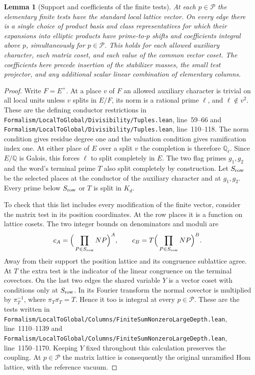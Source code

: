 \documentclass[a4paper,11pt]{article}
\newtheorem{lemma}[proposition]{Lemma}
\theoremstyle{definition}
\theoremstyle{remark}
\newcommand{\srcloc}[2]{{\small\nolinkurl{#1.lean}}, line~#2}
\numberwithin{equation}{section}
\begin{document}
\begin{lemma}[Support and coefficients of the finite tests]\leavevmode
\label{lem:signalsupport452}
At each \(p\in\mathcal P\) the elementary finite tests have the
standard local lattice vector. On every edge there is a single
choice of product basis and class representatives for which their
expansions into elliptic products have prime-to-\(p\) shifts and
coefficients integral above \(p\), simultaneously for
\(p\in\mathcal P\). This holds for each allowed auxiliary
character, each matrix coset, and each value of the common vector
coset. The coefficients here precede insertion of the stabilizer
masses, the small test projector, and any additional scalar
linear combination of elementary columns.
\end{lemma}
\begin{proof}
Write \(F=E^+\). At a place \(v\) of \(F\) an allowed auxiliary
character is trivial on all local units unless \(v\) splits in
\(E/F\), its norm is a rational prime \(\ell\), and
\(\ell\notin v^2\). These are the defining conductor restrictions
in \srcloc{Formalism/LocalToGlobal/Divisibility/Tuples}{59--66}
and \srcloc{Formalism/LocalToGlobal/Divisibility/Tuples}{110--118}.
The norm condition gives residue degree one and the valuation
condition gives ramification index one. At either place of \(E\)
over a split \(v\) the completion is therefore \(\mathbb Q_\ell\).
Since \(E/\mathbb Q\) is Galois, this forces \(\ell\) to split
completely in \(E\). The two flag primes \(g_1,g_2\) and the
word's terminal prime \(T\) also split completely by construction.
Let \(S_{\rm row}\) be the selected places at the conductor of
the auxiliary character and at \(g_1,g_2\). Every prime below
\(S_{\rm row}\) or \(T\) is split in \(K_d\).

To check that this list includes every modification of the finite
vector, consider the matrix test in its position coordinates.
At the row places it is a function on lattice cosets. The two
integer bounds on denominators and moduli are
\[
       c_A=\Big(\prod_{P\in S_{\rm row}} N P\Big)^A,\qquad
       c_B=T\Big(\prod_{P\in S_{\rm row}} N P\Big)^B .
\]
Away from their support the position lattice and its congruence
sublattice agree. At \(T\) the extra test is the indicator of the
linear congruence on the terminal covectors. On the last two
edges the shared variable \(Y\) is a vector coset with conditions
only at \(S_{\rm row}\). In its Fourier transform the normal
covector is multiplied by \(\pi_T^{-1}\), where
\(\pi_T\overline{\pi_T}=T\). Hence it too is integral at every
\(p\in\mathcal P\). These are the tests written in
\srcloc{Formalism/LocalToGlobal/Columns/FiniteSumNonzeroLargeDepth}{1110--1139}
and \srcloc{Formalism/LocalToGlobal/Columns/FiniteSumNonzeroLargeDepth}{1150--1170}.
Keeping \(Y\) fixed throughout this calculation preserves the
coupling. At \(p\in\mathcal P\) the matrix lattice is consequently
the original unramified Hom lattice, with the reference vacuum.


\end{proof}
\end{document}
